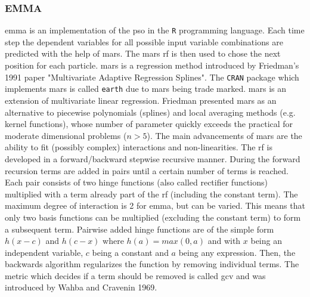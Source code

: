 \subsubsection{EMMA}
\Gls{emma} is an implementation of the \gls{pso} in the \texttt{R} programming language. 
Each time step the dependent variables for all possible input variable combinations %
are predicted with the help of \gls{mars}. 
The \gls{mars} \gls{rf} is then used to chose the next position for each particle.
\Gls{mars} is a regression method introduced by Friedman's 1991 paper 
"Multivariate Adaptive Regression Splines"\cite{friedman1991multivariate}. 
The \texttt{CRAN} package which implements \gls{mars} is called \texttt{earth} due to \gls{mars} being trade marked\cite{mars}.
\gls{mars} is an extension of multivariate linear regression.
Friedman presented \gls{mars} as an alternative to piecewise polynomials (splines) and local averaging methods (e.g. kernel functions), whose number of parameter quickly exceeds the practical for moderate dimensional problems ($n>5$). 
%
%
The main advancements of \gls{mars} are the ability to fit (possibly complex) interactions and non-linearities. 
%
%
The \gls{rf} is developed in a forward/backward stepwise recursive manner. 
During the forward recursion terms are added in pairs until a certain number of terms is reached. 
Each pair consists of two hinge functions (also called rectifier functions) multiplied with a term already part of the \gls{rf} (including the constant term).
The maximum degree of interaction is 2 for \gls{emma}, but can be varied. 
This means that only two basis functions can be multiplied (excluding the constant term) to form a subsequent term.
Pairwise added hinge functions are of the simple form $h(x-c)$ and $h(c-x)$ where $h(a)= max(0,a)$ and with $x$ being an independent variable, $c$ being a constant and $a$ being any expression. 
Then, the backwards algorithm regularizes the function by removing individual terms. 
The metric which decides if a term should be removed is called \gls{gcv} and was introduced by Wahba and Cravenin 1969\cite{wahba1979smoothing}.

